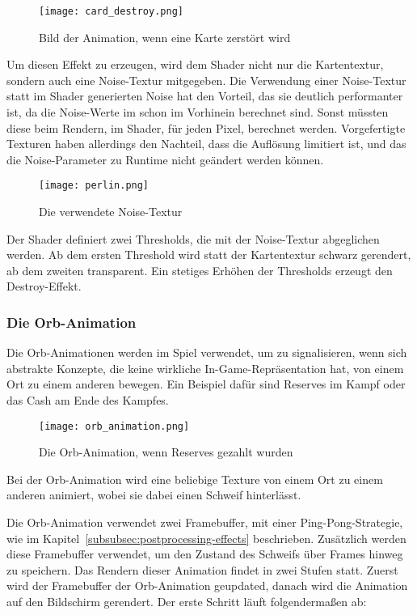 \begin{figure}[H]
    \centering
    \texttt{[image: card\_destroy.png]}
    \caption{Bild der Animation, wenn eine Karte zerstört wird}
\end{figure}

Um diesen Effekt zu erzeugen, wird dem Shader nicht nur die Kartentextur, sondern auch eine Noise-Textur mitgegeben.
Die Verwendung einer Noise-Textur statt im Shader generierten Noise hat den Vorteil, das sie deutlich performanter ist,
da die Noise-Werte im schon im Vorhinein berechnet sind.
Sonst müssten diese beim Rendern, im Shader, für jeden Pixel, berechnet werden.
Vorgefertigte Texturen haben allerdings den Nachteil, dass die Auflösung limitiert ist, und das die Noise-Parameter
zu Runtime nicht geändert werden können.

\begin{figure}[H]
    \centering
    \texttt{[image: perlin.png]}
    \caption{Die verwendete Noise-Textur}
\end{figure}

Der Shader definiert zwei Thresholds, die mit der Noise-Textur abgeglichen werden.
Ab dem ersten Threshold wird statt der Kartentextur schwarz gerendert, ab dem zweiten transparent.
Ein stetiges Erhöhen der Thresholds erzeugt den Destroy-Effekt.

\subsubsection{Die Orb-Animation}

Die Orb-Animationen werden im Spiel verwendet, um zu signalisieren, wenn sich abstrakte Konzepte, die keine wirkliche
In-Game-Repräsentation hat, von einem Ort zu einem anderen bewegen.
Ein Beispiel dafür sind Reserves im Kampf oder das Cash am Ende des Kampfes.

\begin{figure}[H]
    \centering
    \texttt{[image: orb\_animation.png]}
    \caption{Die Orb-Animation, wenn Reserves gezahlt wurden}
\end{figure}

Bei der Orb-Animation wird eine beliebige Texture von einem Ort zu einem anderen animiert, wobei sie dabei einen Schweif
hinterlässt.

Die Orb-Animation verwendet zwei Framebuffer, mit einer Ping-Pong-Strategie, wie im
Kapitel~\ref{subsubsec:postprocessing-effects} beschrieben.
Zusätzlich werden diese Framebuffer verwendet, um den Zustand des Schweifs über Frames hinweg zu speichern.
Das Rendern dieser Animation findet in zwei Stufen statt.
Zuerst wird der Framebuffer der Orb-Animation geupdated, danach wird die Animation auf den Bildschirm gerendert.
Der erste Schritt läuft folgendermaßen ab:

